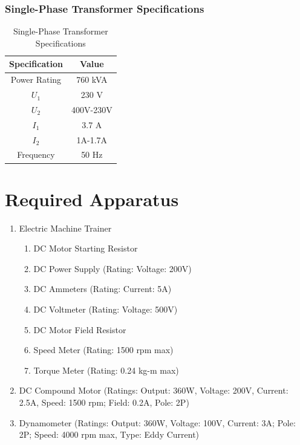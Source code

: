 \documentclass[a4paper,12pt]{article}
\begin{document}
	\subsubsection{Single-Phase Transformer Specifications}
	\begin{table}[H]
		\centering
		\caption{Single-Phase Transformer Specifications}
		\begin{tabular}{| c |c |}
			\hline
			\textbf{Specification} & \textbf{Value} \\ \hline
			Power Rating & 760 kVA \\ \hline
			$U_1$  & 230 V \\ \hline
			$U_2$  & 400V-230V \\ \hline
			$I_1$ & 3.7 A \\ \hline
			$I_2$ & 1A-1.7A \\ \hline
			Frequency & 50 Hz \\ \hline
			
		\end{tabular}
		
		
		\label{tab:3}
	\end{table}
	
	
	
	\section{Required Apparatus}
	\begin{enumerate}
		\item Electric Machine Trainer
		\begin{enumerate}
			\item DC Motor Starting Resistor
			\item DC Power Supply (Rating: Voltage: 200V)
			\item DC Ammeters (Rating: Current: 5A)
			\item DC Voltmeter (Rating: Voltage: 500V)
			\item DC Motor Field Resistor
			\item Speed Meter (Rating: 1500 rpm max)
			\item Torque Meter (Rating: 0.24 kg-m max)
		\end{enumerate}
		
		
		\item DC Compound Motor (Ratings: Output: 360W, Voltage: 200V, Current: 2.5A, Speed: 1500 rpm;  Field: 0.2A, Pole: 2P)
		\item Dynamometer (Ratings: Output: 360W, Voltage: 100V, Current: 3A; Pole: 2P; Speed: 4000 rpm max, Type: Eddy Current)
		
	\end{enumerate}
	\newpage
\end{document}
